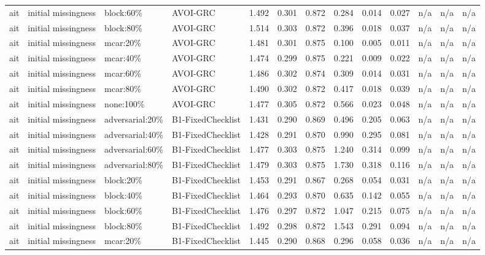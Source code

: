 \begin{table}[!ht]
{\begin{tabular}{lllllllllllll}
ait & initial missingness & block:60\% & AVOI-GRC & 1.492 & 0.301 & 0.872 & 0.284 & 0.014 & 0.027 & n/a & n/a & n/a \\
ait & initial missingness & block:80\% & AVOI-GRC & 1.514 & 0.303 & 0.872 & 0.396 & 0.018 & 0.037 & n/a & n/a & n/a \\
ait & initial missingness & mcar:20\% & AVOI-GRC & 1.481 & 0.301 & 0.875 & 0.100 & 0.005 & 0.011 & n/a & n/a & n/a \\
ait & initial missingness & mcar:40\% & AVOI-GRC & 1.474 & 0.299 & 0.875 & 0.221 & 0.009 & 0.022 & n/a & n/a & n/a \\
ait & initial missingness & mcar:60\% & AVOI-GRC & 1.486 & 0.302 & 0.874 & 0.309 & 0.014 & 0.031 & n/a & n/a & n/a \\
ait & initial missingness & mcar:80\% & AVOI-GRC & 1.490 & 0.302 & 0.872 & 0.417 & 0.018 & 0.039 & n/a & n/a & n/a \\
ait & initial missingness & none:100\% & AVOI-GRC & 1.477 & 0.305 & 0.872 & 0.566 & 0.023 & 0.048 & n/a & n/a & n/a \\
ait & initial missingness & adversarial:20\% & B1-FixedChecklist & 1.431 & 0.290 & 0.869 & 0.496 & 0.205 & 0.063 & n/a & n/a & n/a \\
ait & initial missingness & adversarial:40\% & B1-FixedChecklist & 1.428 & 0.291 & 0.870 & 0.990 & 0.295 & 0.081 & n/a & n/a & n/a \\
ait & initial missingness & adversarial:60\% & B1-FixedChecklist & 1.477 & 0.303 & 0.875 & 1.240 & 0.314 & 0.099 & n/a & n/a & n/a \\
ait & initial missingness & adversarial:80\% & B1-FixedChecklist & 1.479 & 0.303 & 0.875 & 1.730 & 0.318 & 0.116 & n/a & n/a & n/a \\
ait & initial missingness & block:20\% & B1-FixedChecklist & 1.453 & 0.291 & 0.867 & 0.268 & 0.054 & 0.031 & n/a & n/a & n/a \\
ait & initial missingness & block:40\% & B1-FixedChecklist & 1.464 & 0.293 & 0.870 & 0.635 & 0.142 & 0.055 & n/a & n/a & n/a \\
ait & initial missingness & block:60\% & B1-FixedChecklist & 1.476 & 0.297 & 0.872 & 1.047 & 0.215 & 0.075 & n/a & n/a & n/a \\
ait & initial missingness & block:80\% & B1-FixedChecklist & 1.492 & 0.298 & 0.872 & 1.543 & 0.291 & 0.094 & n/a & n/a & n/a \\
ait & initial missingness & mcar:20\% & B1-FixedChecklist & 1.445 & 0.290 & 0.868 & 0.296 & 0.058 & 0.036 & n/a & n/a & n/a \\

\end{tabular}}
\end{table}
